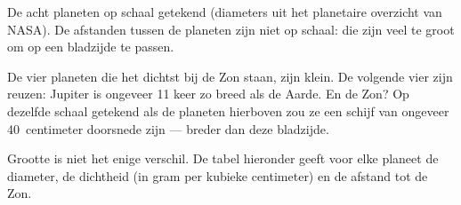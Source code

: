 \begin{omfigure}
\gsixsizes
{}

{\small De acht planeten op schaal getekend (diameters uit het planetaire
overzicht van NASA). De afstanden tussen de planeten zijn niet op schaal:
die zijn veel te groot om op een bladzijde te passen.}
\end{omfigure}

De vier planeten die het dichtst bij de Zon staan, zijn klein. De volgende
vier zijn reuzen: Jupiter is ongeveer 11 keer zo breed als de Aarde. En de
Zon? Op dezelfde schaal getekend als de planeten hierboven zou ze een
schijf van ongeveer 40~centimeter doorsnede zijn --- breder dan deze
bladzijde.

Grootte is niet het enige verschil. De tabel hieronder geeft voor elke
planeet de diameter, de dichtheid (in gram per kubieke centimeter) en de
afstand tot de Zon.

